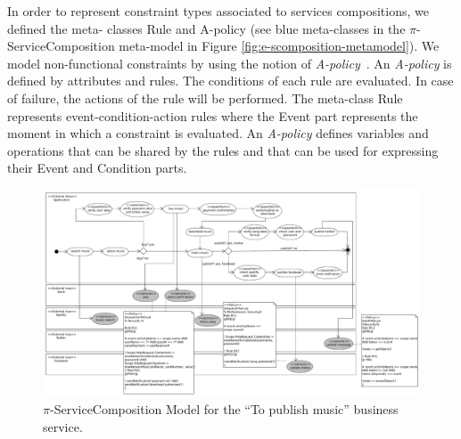 \documentclass{singlecol-new}
\theoremstyle{TH}{
\newtheorem{lemma}{Lemma}
\newtheorem{theorem}[lemma]{Theorem}
\newtheorem{corrolary}[lemma]{Corrolary}
\newtheorem{conjecture}[lemma]{Conjecture}
\newtheorem{proposition}[lemma]{Proposition}
\newtheorem{claim}[lemma]{Claim}
\newtheorem{stheorem}[lemma]{Wrong Theorem}
\newtheorem{algorithm}{Algorithm}
}
\theoremstyle{THrm}{
\newtheorem{definition}{Definition}[section]
\newtheorem{question}{Question}[section]
\newtheorem{remark}{Remark}
\newtheorem{scheme}{Scheme}
}
\theoremstyle{THhit}{
\newtheorem{case}{Case}[section]
}
\theoremstyle{THhsl}{
\newtheorem{example}{Example}
}
\begin{document}
\begin{compactitem}
\item In order to represent constraint types associated to services compositions, we defined the me\-ta- classes {\sc Rule} and {\sc A-policy} (see blue
 meta-classes in the $\pi$-Serv\-ice\-Com\-po\-si\-tion meta-model in Figure \ref{fig:e-scomposition-metamodel}).
We model non-func\-tion\-al constraints by using the notion of {\em A-policy}~\cite{Espinosa-Oviedo2011a,CIC:eovszmc09c}.
An {\em A-policy} is defined by attributes and rules.
The conditions of each rule are evaluated.
In case of failure, the actions of the rule will be performed.
The meta-class {\sc Rule} represents event-condition-action rules where the {\sc Event} part represents the moment in which a constraint  is evaluated.
An {\em A-policy} defines variables and operations that can be shared by the rules and that can be used for expressing their Event and Condition parts.

\end{compactitem}

\begin{figure}[h]
\centering
\includegraphics[width=1\textwidth]{./figures/piServiceComposition-toPublishMusic}
\caption{$\pi$-ServiceComposition Model for the ``To publish music'' business service.}
\label{fig:servicecompositionmodel}
\end{figure}
\end{document}
